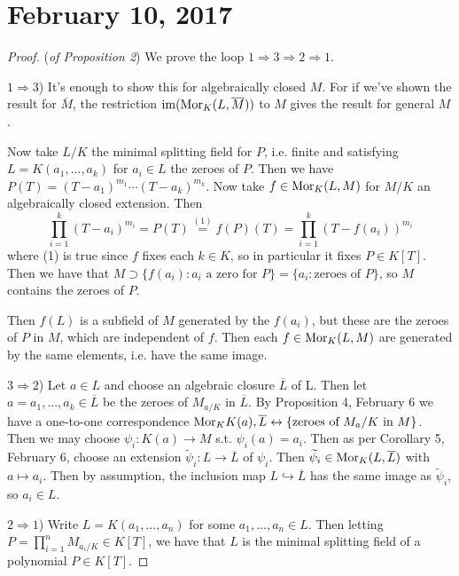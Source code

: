 \section{February 10, 2017}

\begin{proof}
	(\textit{of Proposition 2}) We prove the loop $1 \Rightarrow 3 \Rightarrow 2 \Rightarrow 1$.
	
	$1 \Rightarrow 3$) It's enough to show this for algebraically closed $M$. For if we've shown the result for $\overline{M}$, the restriction $\operatorname{im}(\text{Mor}_K(L, \overline{M}))$ to $M$ gives the result for general $M$.
	
	Now take $L/K$ the minimal splitting field for $P$, i.e. finite and satisfying $L = K(a_1, ..., a_k)$ for $a_i \in L$ the zeroes of $P$. Then we have $P(T) = (T - a_1)^{m_1} \cdots (T - a_k)^{m_k}$. Now take $f \in \text{Mor}_K(L, M)$ for $M/K$ an algebraically closed extension. Then
	\[\prod_{i = 1}^k (T - a_i)^{m_i} = P(T) \stackrel{(1)}{=} f(P)(T) = \prod_{i = 1}^k (T - f(a_i))^{m_i}\]
	where (1) is true since $f$ fixes each $k \in K$, so in particular it fixes $P \in K[T]$. Then we have that $M \supset \{f(a_i) \colon a_i \text{ a zero for } P\} = \{a_i \colon \text{zeroes of } P\}$, so $M$ contains the zeroes of $P$.
	
	Then $f(L)$ is a subfield of $M$ generated by the $f(a_i)$, but these are the zeroes of $P$ in $M$, which are independent of $f$. Then each $f \in \text{Mor}_K(L, M)$ are generated by the same elements, i.e. have the same image.
	
	$3 \Rightarrow 2$) Let $a \in L$ and choose an algebraic closure $\overline{L}$ of L. Then let $a = a_1, ..., a_k \in \overline{L}$ be the zeroes of $M_{a/K}$ in $\overline{L}$. By Proposition 4, February 6 we have a one-to-one correspondence $\text{Mor}_K{K(a), \overline{L}} \leftrightarrow \{\text{zeroes of $M_a/K$ in } M\}$. Then we may choose $\psi_i \colon K(a) \rightarrow M$ s.t. $\psi_i(a) = a_i$. Then as per Corollary 5, February 6, choose an extension $\widetilde{\psi}_i \colon L \rightarrow \overline{L}$ of $\psi_i$. Then $\widetilde{\psi}_i \in \text{Mor}_K(L, \overline{L})$ with $a \mapsto a_i$. Then by assumption, the inclusion map $L \hookrightarrow \overline{L}$ has the same image as $\widetilde{\psi}_i$, so $a_i \in L$.
	
	$2 \Rightarrow 1$) Write $L = K(a_1, ..., a_n)$ for some $a_1, ..., a_n \in L$. Then letting $P = \prod_{i = 1}^n M_{a_i/K} \in K[T]$, we have that $L$ is the minimal splitting field of a polynomial $P \in K[T]$.
\end{proof}

